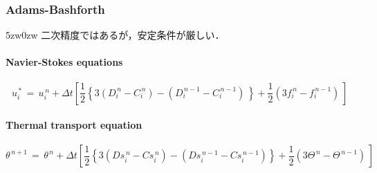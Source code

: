 \subsubsection{Adams-Bashforth}
\begin{indentation}{5zw}{0zw}
二次精度ではあるが，安定条件が厳しい．

\paragraph{Navier-Stokes equations}
\begin{equation}
u_i^{\,*} \,=\, u_i^{\,n} + \Delta t \left[ \frac{1}{2} \left\{  3 \left( D_i^{\,n} - C_i^{\,n} \right)
               - \left( D_i^{\,n-1} - C_i^{\,n-1} \right) \, \right\} + \frac{1}{2} \left( 3f_i^{\,n} - f_i^{\,n-1} \right) \, \right]
\label{eq:pseudo vector AB}
\end{equation}

\paragraph{Thermal transport equation}
\begin{equation}
\theta^{\,n+1} \,=\, \theta^{\,n} + \Delta t \left[ \frac{1}{2} \left\{ 3\left( Ds_i^{\,n}- Cs_i^{\,n} \right) - \left( Ds_i^{\,n-1}- Cs_i^{\,n-1} \right) \right\} + \frac{1}{2} \left( 3\Theta^{\,n} -\Theta^{\,n-1} \right) \, \right]
\label{eq:thermal transport AB}
\end{equation}

\end{indentation}

%
